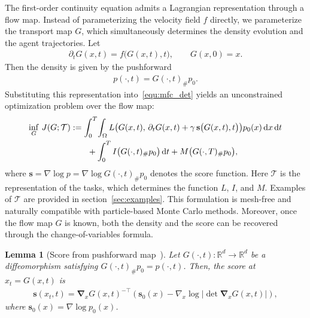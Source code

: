 \documentclass[preprint]{elsarticle}
\newtheorem{lemma}[theorem]{Lemma}
\newcommand{\dd}{\,\mathrm{d}}          %
\newcommand{\qb}[1]{\bigl(#1\bigr)}          %
\newcommand{\R}{\mathbb{R}}
\newcommand{\g}{\gamma}
\newcommand{\Om}{\Omega}
\begin{document}
The first-order continuity equation admits a Lagrangian representation through a flow map. Instead of parameterizing the velocity field $f$ directly, we parameterize the transport map $G$, which simultaneously determines the density evolution and the agent trajectories. Let
\begin{align}\label{equ:pt_G}
    \partial_t G(x,t)=f\bigl(G(x,t),t\bigr),
    \qquad
    G(x,0)=x.
\end{align}
Then the density is given by the pushforward
\begin{align}
    p(\cdot,t)=G(\cdot,t)_\# p_0.
    \label{equ:flow_map}
\end{align}
Substituting this representation into~\eqref{equ:mfc_det} yields an unconstrained optimization problem over the flow map:
\begin{align}
    \inf_{G}\, J(G;\mathcal{T})
    &:= \int_0^T\!\int_\Om L\qb{G(x,t),\, \partial_t G(x,t) + \g\, \mathbf{s}\qb{G(x,t),t}} p_0(x)\dd x\dd t \notag\\
    &\qquad + \int_0^T I\qb{G(\cdot,t)_\# p_0}\dd t
    + M\qb{G(\cdot,T)_\# p_0},
    \label{equ:lagrangian_cost}
\end{align}
where $\mathbf{s}=\nabla\log p = \nabla \log G(\cdot,t)_\# p_0$ denotes the score function. Here $\mathcal{T}$ is the representation of the tasks, which determines the function $L$, $I$, and $M$. Examples of $\mathcal{T}$ are provided in section~\ref{sec:examples}. This formulation is mesh-free and naturally compatible with particle-based Monte Carlo methods. Moreover, once the flow map $G$ is known, both the density and the score can be recovered through the change-of-variables formula.

\begin{lemma}[Score from pushforward map~\cite{Kobyzev2021}]
\label{lem:score_pushforward}
Let $G(\cdot,t):\R^d\to\R^d$ be a diffeomorphism satisfying $G(\cdot,t)_\# p_0=p(\cdot,t)$. Then, the score at $x_t=G(x,t)$ is
\begin{align}
    \mathbf{s}(x_t,t) = \boldsymbol{\nabla}_x G(x,t)^{-\top}
    \left(\mathbf{s}_0(x)-\nabla_x\log\left|\det\boldsymbol{\nabla}_xG(x,t)\right|\right),
    \label{equ:score_compute_jacobian}
\end{align}
where $\mathbf{s}_0(x)=\nabla\log p_0(x)$.
\end{lemma}
\end{document}
